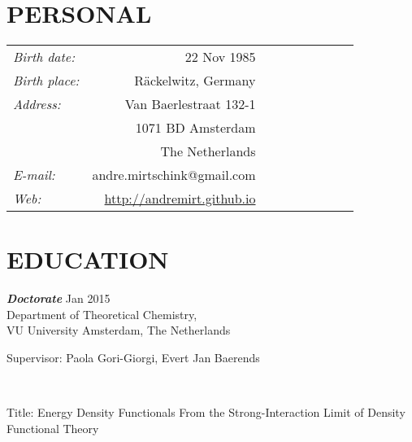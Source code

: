 \documentclass[line,margin]{res}
\begin{document}
 
\begin{resume}
 
\section{PERSONAL}  \medskip
					\begin{tabular}{lrrrrrrrr}
					{\sl Birth date:} & 22 Nov 1985 \\
					{\sl Birth place:} & R\"{a}ckelwitz, Germany\\
					{\sl Address:} & Van Baerlestraat 132-1\\
					& 1071 BD Amsterdam\\
					& The Netherlands\\
					\textit{E-mail:} & andre.mirtschink@gmail.com\\
					\textit{Web:} & \url{http://andremirt.github.io}
					\end{tabular}
 
\section{EDUCATION} {\sl\textbf{Doctorate}} \hfill{} Jan 2015 \\
                \hspace*{1cm} Department of Theoretical Chemistry,\\ 
                \smallskip\hspace*{1cm} VU University Amsterdam, The Netherlands\\
				\hspace*{.5cm}\parbox[t]{12.5cm}{Supervisor: Paola Gori-Giorgi, Evert Jan Baerends}\\
				\hspace*{.5cm}\parbox[t]{12.5cm}{Title: Energy Density Functionals From the Strong-Interaction Limit of Density Functional Theory}%
				

\end{resume}
\end{document}
